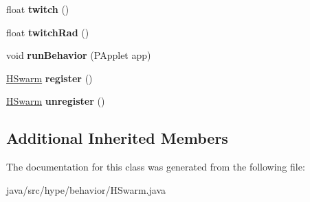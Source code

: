 \begin{DoxyCompactItemize}
\item 
\hypertarget{classhype_1_1behavior_1_1_h_swarm_ac2e03a345f2060a9b1031a032610a254}{float {\bfseries twitch} ()}\label{classhype_1_1behavior_1_1_h_swarm_ac2e03a345f2060a9b1031a032610a254}

\item 
\hypertarget{classhype_1_1behavior_1_1_h_swarm_a1c8e689465a9d5fe631bc82048f5b92f}{float {\bfseries twitch\-Rad} ()}\label{classhype_1_1behavior_1_1_h_swarm_a1c8e689465a9d5fe631bc82048f5b92f}

\item 
\hypertarget{classhype_1_1behavior_1_1_h_swarm_ac6740ebc12f11d4b601e2b41602852fc}{void {\bfseries run\-Behavior} (P\-Applet app)}\label{classhype_1_1behavior_1_1_h_swarm_ac6740ebc12f11d4b601e2b41602852fc}

\item 
\hypertarget{classhype_1_1behavior_1_1_h_swarm_aed2bec15f13b547c9102186b9d5aeede}{\hyperlink{classhype_1_1behavior_1_1_h_swarm}{H\-Swarm} {\bfseries register} ()}\label{classhype_1_1behavior_1_1_h_swarm_aed2bec15f13b547c9102186b9d5aeede}

\item 
\hypertarget{classhype_1_1behavior_1_1_h_swarm_a421e4284f278470402c8fab4b262a01f}{\hyperlink{classhype_1_1behavior_1_1_h_swarm}{H\-Swarm} {\bfseries unregister} ()}\label{classhype_1_1behavior_1_1_h_swarm_a421e4284f278470402c8fab4b262a01f}

\end{DoxyCompactItemize}
\subsection*{Additional Inherited Members}


The documentation for this class was generated from the following file\-:\begin{DoxyCompactItemize}
\item 
java/src/hype/behavior/H\-Swarm.\-java\end{DoxyCompactItemize}
